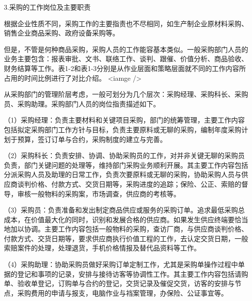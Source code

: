     3.采购的工作岗位及主要职责

    根据企业性质不同，采购工作的主要指责也不尽相同，如生产制企业原材料采购、销售企业商品采购、政府设备采购等。

    但是，不管是何种商品采购，采购人员的工作能容基本类似。一般采购部门人员的业务主要包含：报表审批、文书、联络工作、谈判、跟催、价值分析、商品验收、财务结算等工作。表1-2和表1-3分别是从作业层面和策略层面就不同的工作内容所占用的时间比例进行了对比介绍。
    <iamge />

    从采购部门的管理阶层考虑，一般可划分为几个层次：采购经理、采购科长、采购员、采购助理。采购部门人员的岗位指责描述如下。

    （1）采购经理：负责主要材料和关键项目采购，部门的统筹管理，主要工作内容包括拟定采购部门工作方针与目标，负责主要原料或无聊的采购，编制年度采购计划于预算，签订订单与合约，采购制度的建立与完善。

    （2）采购科长：负责安排、协调、协助采购员的工作，对并非关键无聊的采购员负责，部门关键问题的处理等，维持部门采购业务顺利开展。其主要工作内容包括分派采购人员及助理的日常工作，负责次要原料或无聊的采购，协助采购人员与供应商谈判价格、付款方式、交货日期等，采购进度的追踪；保险、公正、索赔的督导，审核一般物料的采购案，市场调查，供应商的考核等。

    （3）采购员：负责准备和发出制定商品供应或服务的采购订单。追求最低采购总成本，在价值最大化的同时，识别和发展合格的供应商。如果发生供应终端要恰当地加以协调。主要工作内容包括一般物料的采购，查访厂商，与供应商谈判价格、付款方式、交货日期等，要求供应商执行价值工程的工作，去认定交货日期，一般索赔案件的处理，处理退货，手机价格情报及替代品资料等工作。

    （4）采购助理：协助采购员做好采购订单定制工作，尤其是采购单操作过程中单据的登记和事项的记录，安排与接待访客等协调性工作。其主要工作内容包括请购单、验收单登记，订购单与合约的登记，交货记录及催促交货，访客的安排与节点，采购费用的申请与报支，电脑作业与裆案管理，办保险、公证事宜等。
